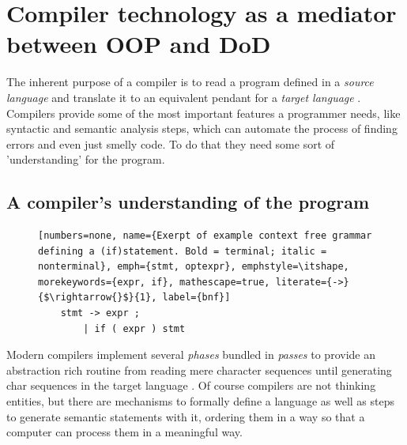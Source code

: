 \chapter{Compiler technology as a mediator between OOP and DoD}
The inherent purpose of a compiler is to read a program defined in a \textit{source language} and translate it to an equivalent pendant for a \textit{target language} .\\
Compilers provide some of the most important features a programmer needs, like syntactic and semantic analysis steps, which can automate the process of finding errors and even just smelly code. To do that they need some sort of 'understanding' for the program.

\section{A compiler's understanding of the program}\label{compilers_understanding}
\begin{figure}
	\begin{lstlisting}[numbers=none, name={Exerpt of example context free grammar defining a (if)statement. Bold = terminal; italic = nonterminal}, emph={stmt, optexpr}, emphstyle=\itshape, morekeywords={expr, if}, mathescape=true, literate={->}{$\rightarrow{}$}{1}, label={bnf}]
	stmt -> expr ;
		| if ( expr ) stmt
	\end{lstlisting}
\end{figure}
Modern compilers implement several \textit{phases} bundled in \textit{passes} to provide an abstraction rich routine from reading mere character sequences until generating char sequences in the target language . Of course compilers are not thinking entities, but there are mechanisms to formally define a language as well as steps to generate semantic statements with it, ordering them in a way so that a computer can process them in a meaningful way.
